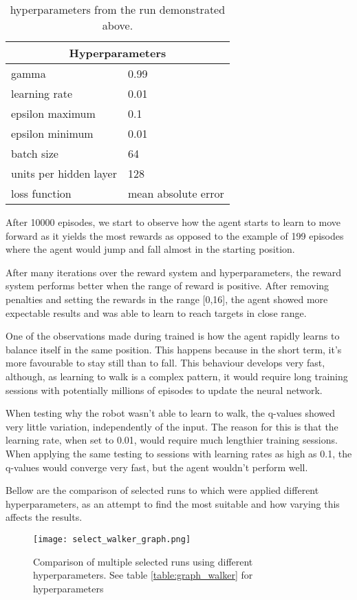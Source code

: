 \begin{table}[H]
 \centering
 \caption{hyperparameters from the run demonstrated above.}
 \begin{tabular}{|ll|}
 \hline
 \multicolumn{2}{|c|}{Hyperparameters} \\ \hline
 \multicolumn{1}{|l|}{gamma} & 0.99 \\ \hline
 \multicolumn{1}{|l|}{learning rate} & 0.01 \\ \hline
 \multicolumn{1}{|l|}{epsilon maximum} & 0.1 \\ \hline
 \multicolumn{1}{|l|}{epsilon minimum} & 0.01 \\ \hline
 \multicolumn{1}{|l|}{batch size} & 64 \\ \hline
 \multicolumn{1}{|l|}{units per hidden layer} & 128 \\ \hline
 \multicolumn{1}{|l|}{loss function} & mean absolute error \\ \hline
 \end{tabular}
\end{table}
After 10000 episodes, we start to observe how the agent starts to learn to move forward as it yields the most rewards as opposed to the example of 199 episodes where the agent would jump and fall almost in the starting position.

After many iterations over the reward system and hyperparameters, the reward system performs better when the range of reward is positive. After removing penalties and setting the rewards in the range [0,16], the agent showed more expectable results and was able to learn to reach targets in close range.

One of the observations made during trained is how the agent rapidly learns to balance itself in the same position. This happens because in the short term, it's more favourable to stay still than to fall. This behaviour develops very fast, although, as learning to walk is a complex pattern, it would require long training sessions with potentially millions of episodes to update the neural network.

When testing why the robot wasn't able to learn to walk, the q-values showed very little variation, independently of the input. The reason for this is that the learning rate, when set to 0.01, would require much lengthier training sessions. When applying the same testing to sessions with learning rates as high as 0.1, the q-values would converge very fast, but the agent wouldn't perform well.

Bellow are the comparison of selected runs to which were applied different hyperparameters, as an attempt to find the most suitable and how varying this affects the results.
\begin{figure}[H]
 \centering
 \texttt{[image: select\_walker\_graph.png]}
 \caption{Comparison of multiple selected runs using different hyperparameters. See table \ref*{table:graph_walker} for hyperparameters}
\end{figure}

